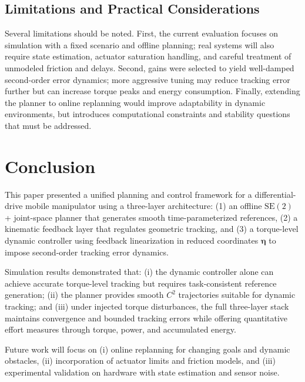 \documentclass[conference]{IEEEtran}
\newcommand{\etav}{\bm{\eta}}
\begin{document}
\subsection{Limitations and Practical Considerations}
Several limitations should be noted. First, the current evaluation focuses on
simulation with a fixed scenario and offline planning; real systems will also
require state estimation, actuator saturation handling, and careful treatment of
unmodeled friction and delays. Second, gains were selected to yield
well-damped second-order error dynamics; more aggressive tuning may reduce
tracking error further but can increase torque peaks and energy consumption.
Finally, extending the planner to online replanning would improve adaptability
in dynamic environments, but introduces computational constraints and stability
questions that must be addressed.

\section{Conclusion}
\label{sec:conclusion}
This paper presented a unified planning and control framework for a
differential-drive mobile manipulator using a three-layer architecture:
(1) an offline $\mathrm{SE}(2)$ + joint-space planner that generates smooth
time-parameterized references, (2) a kinematic feedback layer that regulates
geometric tracking, and (3) a torque-level dynamic controller using feedback
linearization in reduced coordinates $\etav$ to impose second-order tracking
error dynamics.

Simulation results demonstrated that: (i) the dynamic controller alone can
achieve accurate torque-level tracking but requires task-consistent reference
generation; (ii) the planner provides smooth $C^2$ trajectories suitable for
dynamic tracking; and (iii) under injected torque disturbances, the full
three-layer stack maintains convergence and bounded tracking errors while
offering quantitative effort measures through torque, power, and accumulated
energy.

Future work will focus on (i) online replanning for changing goals and dynamic
obstacles, (ii) incorporation of actuator limits and friction models, and
(iii) experimental validation on hardware with state estimation and sensor
noise.



\end{document}
